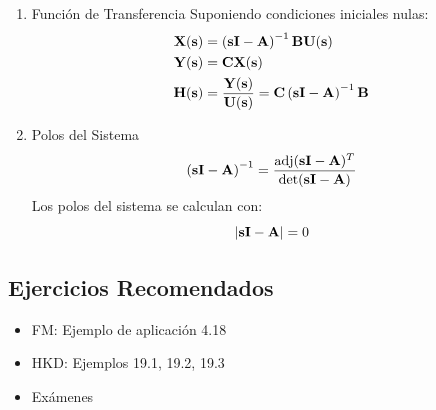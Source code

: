 \begin{enumerate}
\item Función de Transferencia
\label{sec:org9909554}
Suponiendo condiciones iniciales nulas:
\begin{align*}
  \mathbf{X}(\mathbf{s}) &= \left(\mathbf{s} \mathbf{I} - \mathbf{A} \right)^{-1} \mathbf{B} \mathbf{U}(\mathbf{s})\\
  \mathbf{Y}(\mathbf{s}) &= \mathbf{C} \mathbf{X}(\mathbf{s})\\
  \mathbf{H}(\mathbf{s}) &= \frac{\mathbf{Y}(\mathbf{s})}{\mathbf{U}(\mathbf{s})}  = \mathbf{C} \left(\mathbf{s} \mathbf{I} - \mathbf{A} \right)^{-1} \mathbf{B}
\end{align*}

\item Polos del Sistema
\label{sec:org44dedd9}
\[
  \left(\mathbf{s} \mathbf{I} - \mathbf{A} \right)^{-1} = \frac{\text{adj}(\mathbf{s} \mathbf{I} - \mathbf{A})^T}{\det(\mathbf{s} \mathbf{I} - \mathbf{A})}
\]
Los polos del sistema se calculan con:
\[
|\mathbf{s} \mathbf{I} - \mathbf{A}| = 0
\]
\end{enumerate}

\subsection{Ejercicios Recomendados}

\begin{itemize}
\item FM: Ejemplo de aplicación 4.18
\item HKD: Ejemplos 19.1, 19.2, 19.3
\item Exámenes
\end{itemize}

